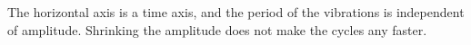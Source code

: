 The horizontal axis is a time axis, and the period of the vibrations
is independent of amplitude. Shrinking the amplitude does not
make the cycles any faster.
